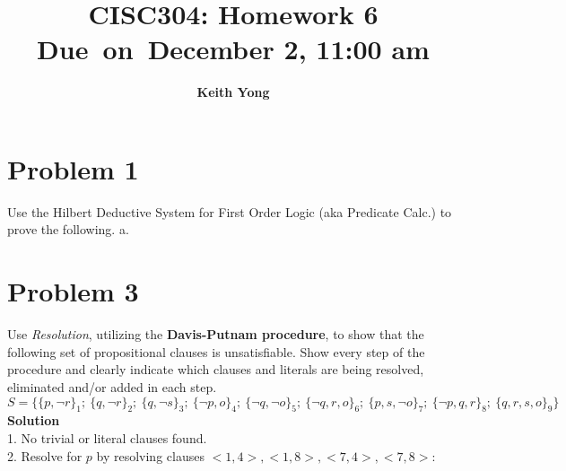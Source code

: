 \documentclass{article}
\title{
	\vspace{2in}
	\textmd{\textbf{CISC304: Homework 6}}\\
	\normalsize\vspace{0.1in}\small{Due\ on\ December 2, 11:00 am}\\
	\vspace{3in}
}
\author{\textbf{Keith Yong}}
\date{}
\newcommand{\solution}{\textbf{\large Solution}}
\begin{document}
\maketitle
\pagebreak

\section*{Problem 1}
Use the Hilbert Deductive System for First Order Logic (aka Predicate Calc.) to prove the following.
a.

\pagebreak
\section*{Problem 3}
Use \emph{Resolution}, utilizing the \textbf{Davis-Putnam procedure}, to show that the following set of propositional clauses is unsatisfiable. Show every step of the procedure and clearly indicate which clauses and literals are being resolved, eliminated and/or added in each step.\\

\noindent
\small{
    $S = \{\{p, \neg{r}\}_{1};\ \{q, \neg{r}\}_{2};\ \{q, \neg{s}\}_{3};\ \{\neg{p},     o\}_{4};\ \{\neg{q}, \neg{o}\}_{5};\ \{\neg{q}, r, o\}_{6};\ \{p, s, \neg{o    }\}_{7};\ \{\neg{p}, q, r\}_{8};\ \{q, r, s, o\}_{9}\}$
}\\

\noindent
\solution\\

1. No trivial or literal clauses found.\\

2. Resolve for $p$ by resolving clauses $<1, 4>, <1, 8>, <7, 4>, <7, 8>$:
\end{document}
